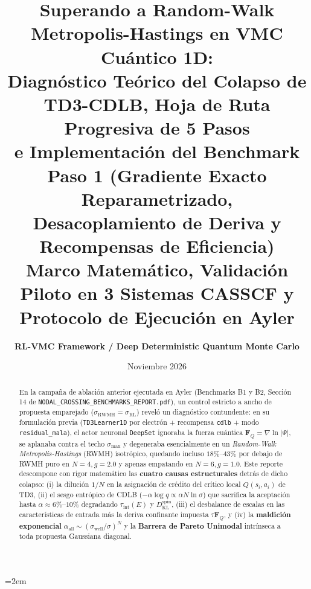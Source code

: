\documentclass[10pt,a4paper]{article}
\title{\textbf{\Large Superando a Random-Walk Metropolis-Hastings en VMC Cuántico 1D:\\
Diagnóstico Teórico del Colapso de TD3-CDLB, Hoja de Ruta Progresiva de 5 Pasos\\
e Implementación del Benchmark Paso 1 (Gradiente Exacto Reparametrizado,\\
Desacoplamiento de Deriva y Recompensas de Eficiencia)}\\[0.3cm]
\large Marco Matemático, Validación Piloto en 3 Sistemas CASSCF y Protocolo de Ejecución en Ayler}
\author{\textbf{RL-VMC Framework / Deep Deterministic Quantum Monte Carlo}}
\date{Noviembre 2026}
\begin{document}
\emergencystretch=2em
\maketitle

\begin{abstract}
En la campaña de ablación anterior ejecutada en Ayler (Benchmarks B1 y B2, Sección 14 de \texttt{NODAL\_CROSSING\_BENCHMARKS\_REPORT.pdf}), un control estricto a ancho de propuesta emparejado ($\sigma_{\mathrm{RWMH}} = \sigma_{\mathrm{RL}}$) reveló un diagnóstico contundente: en su formulación previa (\texttt{TD3Learner1D} por electrón + recompensa \texttt{cdlb} + modo \texttt{residual\_mala}), el actor neuronal \texttt{DeepSet} ignoraba la fuerza cuántica $\bm{F}_Q = \nabla\ln|\Psi|$, se aplanaba contra el techo $\sigma_{\max}$ y degeneraba esencialmente en un \textit{Random-Walk Metropolis-Hastings} (RWMH) isotrópico, quedando incluso $18\%\text{--}43\%$ por debajo de RWMH puro en $N=4, g=2.0$ y apenas empatando en $N=6, g=1.0$. Este reporte descompone con rigor matemático las \textbf{cuatro causas estructurales} detrás de dicho colapso: (i) la dilución $1/N$ en la asignación de crédito del crítico local $Q(s_i, a_i)$ de TD3, (ii) el sesgo entrópico de CDLB ($-\alpha\log q \propto \alpha N \ln\sigma$) que sacrifica la aceptación hasta $\alpha \approx 6\%\text{--}10\%$ degradando $\tau_{\mathrm{int}}(E)$ y $D_{\mathrm{KL}}^{\mathrm{spin}}$, (iii) el desbalance de escalas en las características de entrada más la deriva confinante impuesta $\tau\bm{F}_Q$, y (iv) la \textbf{maldición exponencial} $\alpha_{\mathrm{all}} \sim (\sigma_{\mathrm{well}}/\sigma)^N$ y la \textbf{Barrera de Pareto Unimodal} intrínseca a toda propuesta Gaussiana diagonal.


\end{abstract}
\end{document}
